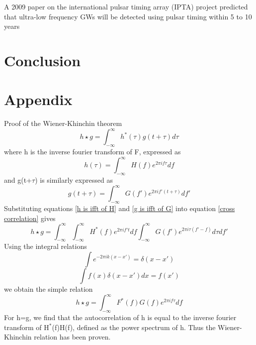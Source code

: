 \documentclass[12pt]{article}
\begin{document}
	A 2009 paper on the international pulsar timing array (IPTA) project predicted that ultra-low frequency GWs will be detected using pulsar timing within 5 to 10 years \cite{hobbs2010international}
	
	\section{Conclusion}
	
	\section{Appendix}
	Proof of the Wiener-Khinchin theorem\\
		\begin{equation}\label{cross correlation}
	h \star g=\int_{-\infty}^{\infty}h^{*}(\tau)g(t+\tau)d\tau
	\end{equation}
	where h is the inverse fourier transform of F, expressed as
	\begin{equation}\label{h is ifft of H}
	h(\tau)=\int_{-\infty}^{\infty}H(f)e^{2 \pi i f \tau}df
	\end{equation}
	and g(t+$\tau$) is similarly expressed as 
	\begin{equation}\label{g is ifft of G}
	g(t+\tau)=\int_{-\infty}^{\infty}G(f')e^{2 \pi i f'(t+ \tau)}df'
	\end{equation}
	Substituting equations \ref{h is ifft of H} and \ref{g is ifft of G} into equation \ref{cross correlation} gives
	\begin{equation}\label{cross correlation 2}
	h \star g=\int_{-\infty}^{\infty}\int_{-\infty}^{\infty}H^{*}(f)e^{2 \pi i f't}df \int_{-\infty}^{\infty}G(f')e^{2 \pi i \tau(f'-f)}d\tau df'
	\end{equation}
	Using the integral relations
	\begin{equation}\label{integral relation 1}
	\int e^{-2 \pi i k (x-x')}=\delta(x-x')
	\end{equation}
	\begin{equation}\label{integral relation 2}
	\int f(x)\delta(x-x')dx=f(x')
	\end{equation}
	we obtain the simple relation
	\begin{equation}\label{cross correlation 3}
	h \star g=\int_{-\infty}^{\infty}F^{*}(f)G(f)e^{2 \pi i f\tau}df
	\end{equation}
	For h=g, we find that the autocorrelation of h is equal to the inverse fourier transform of H$^{*}$(f)H(f), defined as the power spectrum of h. Thus the Wiener-Khinchin relation has been proven. 
	
	
\end{document}
